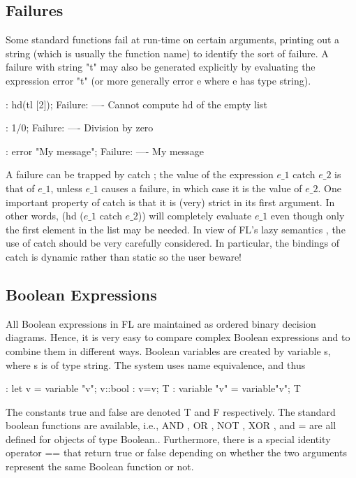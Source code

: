 \subsection{Failures}

Some standard functions fail at run-time on certain arguments, printing
out a string (which is usually the function name) to identify the sort
of failure. A failure%
%
{} with string "t" may also be
generated explicitly by evaluating the expression error "t" (or more
generally error%
%
{} e where e has type string).
\begin{hol}
: hd(tl [2]);
Failure:    ----  Cannot compute hd of the empty list

: 1/0;
Failure:    ----  Division by zero


: error "My message";
Failure:    ----   My message
\end{hol}

A failure can be trapped%
%
{} by catch%
%
{}; the value of the expression $e\_1$ catch
$e\_2$ is that of $e\_1$, unless
$e\_1$ causes a failure, in which case it is the value of $e\_2$. One important
property of catch is that it is
(very) strict in its first argument. In other words, (hd ($e\_1$ catch
$e\_2$)) will completely evaluate $e\_1$
even though only the first element in the list may be needed. In view
of FL's lazy semantics%
%
{}, the
use of catch should be very carefully considered. In particular, the
bindings of catch is dynamic
rather than static so the user beware!

\subsection{Boolean Expressions}

All Boolean expressions%
%
{} in FL are maintained as ordered binary decision
diagrams. Hence, it
is very easy to compare complex Boolean expressions and to combine
them in different ways.
Boolean variables%
%
{} are created by variable%
%
{} s, where s is of type string.
The system uses name
equivalence, and thus
\begin{hol}
: let v = variable "v";
v::bool
: v=v;
T
: variable "v" = variable"v";
T
\end{hol}

The constants true%
%
{} and false%
%
{} are denoted T and F respectively. The
standard boolean functions
are available, i.e., AND%
%
{}, OR%
%
{}, NOT%
%
{}, XOR%
%
{}, and =%
\index{=}%
{} are all defined for objects of type Boolean..
Furthermore, there
is a special identity%
%
{} operator ==%
\index{==}%
{} that return true or false depending
on whether the two arguments
represent the same Boolean function or not.

